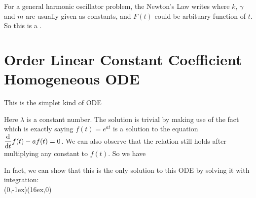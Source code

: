 \documentclass[class=article, crop=false, 12pt]{standalone}
\begin{document}
\begin{notation}[]
    For a general harmonic oscillator problem, the Newton's  Law writes 
    where $k$, $\gamma$ and $m$ are usually given as constants, 
    and $F(t)$ could be arbituary function of $t$. 
    So this is a .

\end{notation}


\linesep
\section{ Order Linear Constant Coefficient Homogeneous ODE}

This is the simplet kind of ODE

Here $\lambda$ is a constant number. 
The solution is trivial by making use of the fact 
which is exactly saying $f(t)=e^{at}$ is a solution to the equation
$\dvv{t}f(t) - af(t) = 0$.
We can also observe that the relation still holds after 
multiplying any constant to $f(t)$. So we have
\\

In fact, we can show that this is the only solution to this ODE by solving it with integration:
\\
{(0,-1ex)}{(16ex,0)}
\end{document}

